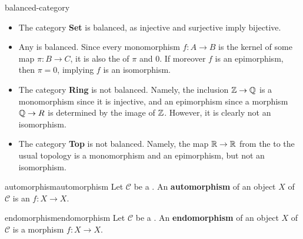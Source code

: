 \begin{example}{balanced-category}
    \begin{itemize}
        \item The category \textbf{Set} is balanced, as injective and surjective imply bijective.
        
        \item Any  is balanced. Since every monomorphism $f \colon A \to B$ is the kernel of some map $\pi \colon B \to C$, it is also the  of $\pi$ and $0$. If moreover $f$ is an epimorphism, then $\pi = 0$, implying $f$ is an isomorphism.
    
        \item The category \textbf{Ring} is not balanced. Namely, the inclusion $\mathbb{Z} \to \mathbb{Q}$ is a monomorphism since it is injective, and an epimorphism since a morphism $\mathbb{Q} \to R$ is determined by the image of $\mathbb{Z}$. However, it is clearly not an isomorphism.
    
        \item The category \textbf{Top} is not balanced. Namely, the map $\mathbb{R} \to \mathbb{R}$ from the  to the usual topology is a monomorphism and an epimorphism, but not an isomorphism.
    \end{itemize}
\end{example}

\begin{topic}{automorphism}{automorphism}
    Let $\mathcal{C}$ be a . An \textbf{automorphism} of an object $X$ of $\mathcal{C}$ is an  $f \colon X \to X$.
\end{topic}

\begin{topic}{endomorphism}{endomorphism}
    Let $\mathcal{C}$ be a . An \textbf{endomorphism} of an object $X$ of $\mathcal{C}$ is a morphism $f \colon X \to X$.
\end{topic}

